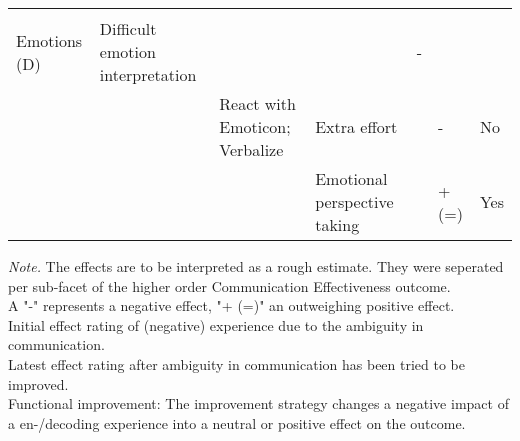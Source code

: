 \documentclass[man]{apa7}
\begin{document}
\begin{landscape}
\begin{table}
\begin{tabular}{lllllll}
                                   &                                                 &                                  &                                        &             &             &                                 \\
Emotions (D)                       & Difficult emotion interpretation                &                                  &                                        & -           &             &                                 \\
                                   &                                                 & React with Emoticon; Verbalize   & Extra effort                           &             & -           & No                              \\
                                   &                                                 &                                  & Emotional perspective taking  &             & + (=)       & Yes                               \\ \bottomrule
\end{tabular}
  \begin{tablenotes}
        {\tiny
        \textit{Note.} The effects are to be interpreted as a rough estimate. They were seperated per sub-facet of the higher order Communication Effectiveness outcome.  \\
        A "-" represents a negative effect, "+ (=)" an outweighing positive effect. \\
         Initial effect rating of (negative) experience due to the ambiguity in communication. \\ 
         Latest effect rating after ambiguity in communication has been tried to be improved. \\
        Functional improvement: The improvement strategy changes a negative impact of a en-/decoding experience into a neutral or positive effect on the outcome.
         }
    \end{tablenotes}
\end{table}

\end{landscape}
\end{document}
